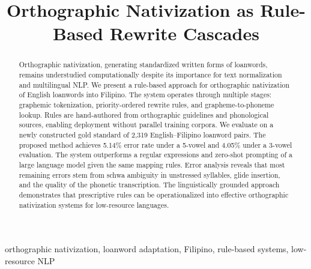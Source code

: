 \documentclass[a4paper, conference]{IEEEtran}
\begin{document}
\title{Orthographic Nativization as Rule-Based Rewrite Cascades}

\author{
}

\maketitle

\begin{abstract}

    Orthographic nativization, generating standardized written forms of loanwords,
    remains understudied computationally despite its importance for text
    normalization and multilingual NLP. We present a rule-based approach for
    orthographic nativization of English loanwords into Filipino. The system
    operates through multiple stages: graphemic tokenization, priority-ordered
    rewrite rules, and grapheme-to-phoneme lookup. Rules are hand-authored from
    orthographic guidelines and phonological sources, enabling deployment without
    parallel training corpora. We evaluate on a newly constructed gold standard of
    2,319 English--Filipino loanword pairs. The proposed method achieves 5.14\%
    error rate under a 5-vowel and 4.05\% under a 3-vowel evaluation. The system
    outperforms a regular expressions and zero-shot prompting of a large language model given
    the same mapping rules. Error analysis reveals that most remaining errors stem
    from schwa ambiguity in unstressed syllables, glide insertion, and the quality
    of the phonetic transcription. The linguistically grounded approach
    demonstrates that prescriptive rules can be operationalized into effective
    orthographic nativization systems for low-resource languages.

\end{abstract}

\begin{IEEEkeywords}
    orthographic nativization,
    loanword adaptation,
    Filipino,
    rule-based systems,
    low-resource NLP
\end{IEEEkeywords}











\end{document}
